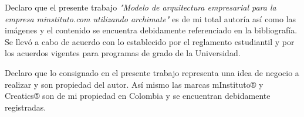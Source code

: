 Declaro que el presente trabajo \textit{"Modelo de arquitectura empresarial para la empresa minstituto.com utilizando archimate"} es de mi total autoría así como las imágenes y el contenido se encuentra debidamente referenciado en la bibliografía. Se llevó a cabo de acuerdo con lo establecido por el reglamento estudiantil y por los acuerdos vigentes para programas de grado de la Universidad.

Declaro que lo consignado en el presente trabajo representa una idea de negocio a realizar y son propiedad del autor. Así mismo las marcas mInstituto® y Creatics® son de mi propiedad en Colombia y se encuentran debidamente registradas.
